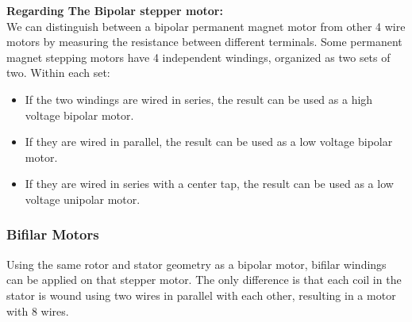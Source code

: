 \documentclass[journal]{IEEEtran}
\begin{document}
\textbf{Regarding The Bipolar stepper motor:}\\
We can distinguish between a bipolar permanent magnet motor from other 4 wire motors by measuring the resistance between different terminals.  Some permanent magnet stepping motors have 4 independent windings, organized as two sets of two. Within each set:
\begin{itemize}
    \item  If the two windings are wired in series, the result can be used as a high voltage bipolar motor.
    \item If they are wired in parallel, the result can be used as a low voltage bipolar motor.
    \item If they are wired in series with a center tap, the result can be used as a low voltage unipolar motor.
\end{itemize}

\subsubsection{Bifilar Motors}\hfill

Using the same rotor and stator geometry as a bipolar motor, bifilar windings can be applied on that stepper motor. The only difference is that each coil in the stator is wound using two wires in parallel with each other, resulting in a motor with 8 wires.\\
\end{document}
